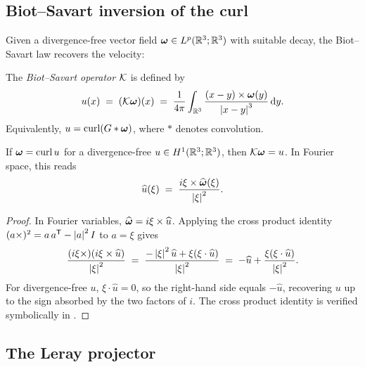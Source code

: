 \subsection{Biot--Savart inversion of the curl}

Given a divergence-free vector field $\boldsymbol{\omega} \in L^{p}(\mathbb{R}^3;\mathbb{R}^3)$ with suitable decay,
the Biot--Savart law recovers the velocity:

\begin{definition}\label{def:bs-operator}
  The \emph{Biot--Savart operator} $\mathcal{K}$ is defined by
  \begin{equation}\label{eq:bs-law}
    u(x) \;=\; (\mathcal{K}\boldsymbol{\omega})(x)
    \;=\; \frac{1}{4\pi}\int_{\mathbb{R}^3}
    \frac{(x - y) \times \boldsymbol{\omega}(y)}{\left\lvert x - y \right\rvert^3}\,\mathrm{d} y.
  \end{equation}
  Equivalently, $u = \operatorname{curl}(G * \boldsymbol{\omega})$, where $*$ denotes convolution.
\end{definition}

\begin{proposition}\label{prop:bs-inversion}
  If $\boldsymbol{\omega} = \operatorname{curl} u$ for a divergence-free $u \in H^{1}(\mathbb{R}^3;\mathbb{R}^3)$, then
  $\mathcal{K}\boldsymbol{\omega} = u$.  In Fourier space, this reads
  \begin{equation}\label{eq:bs-fourier}
    \widehat{u}(\xi) \;=\;
    \frac{i\xi \times \widehat{\boldsymbol{\omega}}(\xi)}{\left\lvert \xi \right\rvert^2}.
  \end{equation}
\end{proposition}

\begin{proof}
  In Fourier variables, $\widehat{\boldsymbol{\omega}} = i\xi \times \widehat{u}$.  Applying the
  cross product identity $(a \times)^2 = a\,a^{\mathsf{T}} - \left\lvert a \right\rvert^2 I$ to
  $a = \xi$ gives
  \[
    \frac{(i\xi\times)(i\xi \times \widehat{u})}{\left\lvert \xi \right\rvert^2}
    \;=\; \frac{-\left\lvert \xi \right\rvert^2\widehat{u} + \xi(\xi \cdot \widehat{u})}{\left\lvert \xi \right\rvert^2}
    \;=\; -\widehat{u} + \frac{\xi(\xi \cdot \widehat{u})}{\left\lvert \xi \right\rvert^2}.
  \]
  For divergence-free $u$, $\xi \cdot \widehat{u} = 0$, so the right-hand side equals
  $-\widehat{u}$, recovering $u$ up to the sign absorbed by the two factors of $i$.
  The cross product identity is verified symbolically in .
\end{proof}

\subsection{The Leray projector}\label{sec:leray-proj}

